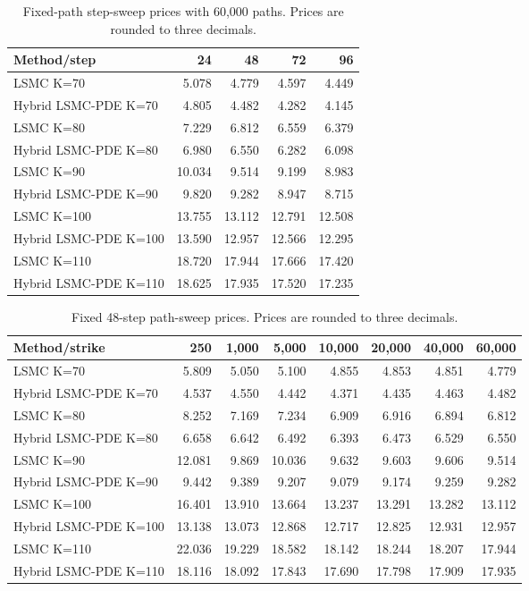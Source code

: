 \begin{table}[htbp]\centering
\caption{Fixed-path step-sweep prices with 60,000 paths. Prices are rounded to three decimals.}
\begin{tabular}{lrrrr}
\toprule
Method/step & 24 & 48 & 72 & 96 \\
\midrule
LSMC K=70 & 5.078 & 4.779 & 4.597 & 4.449 \\
Hybrid LSMC-PDE K=70 & 4.805 & 4.482 & 4.282 & 4.145 \\
LSMC K=80 & 7.229 & 6.812 & 6.559 & 6.379 \\
Hybrid LSMC-PDE K=80 & 6.980 & 6.550 & 6.282 & 6.098 \\
LSMC K=90 & 10.034 & 9.514 & 9.199 & 8.983 \\
Hybrid LSMC-PDE K=90 & 9.820 & 9.282 & 8.947 & 8.715 \\
LSMC K=100 & 13.755 & 13.112 & 12.791 & 12.508 \\
Hybrid LSMC-PDE K=100 & 13.590 & 12.957 & 12.566 & 12.295 \\
LSMC K=110 & 18.720 & 17.944 & 17.666 & 17.420 \\
Hybrid LSMC-PDE K=110 & 18.625 & 17.935 & 17.520 & 17.235 \\
\bottomrule
\end{tabular}
\end{table}

\begin{table}[htbp]\centering
\caption{Fixed 48-step path-sweep prices. Prices are rounded to three decimals.}
\begin{tabular}{lrrrrrrr}
\toprule
Method/strike & 250 & 1,000 & 5,000 & 10,000 & 20,000 & 40,000 & 60,000 \\
\midrule
LSMC K=70 & 5.809 & 5.050 & 5.100 & 4.855 & 4.853 & 4.851 & 4.779 \\
Hybrid LSMC-PDE K=70 & 4.537 & 4.550 & 4.442 & 4.371 & 4.435 & 4.463 & 4.482 \\
LSMC K=80 & 8.252 & 7.169 & 7.234 & 6.909 & 6.916 & 6.894 & 6.812 \\
Hybrid LSMC-PDE K=80 & 6.658 & 6.642 & 6.492 & 6.393 & 6.473 & 6.529 & 6.550 \\
LSMC K=90 & 12.081 & 9.869 & 10.036 & 9.632 & 9.603 & 9.606 & 9.514 \\
Hybrid LSMC-PDE K=90 & 9.442 & 9.389 & 9.207 & 9.079 & 9.174 & 9.259 & 9.282 \\
LSMC K=100 & 16.401 & 13.910 & 13.664 & 13.237 & 13.291 & 13.282 & 13.112 \\
Hybrid LSMC-PDE K=100 & 13.138 & 13.073 & 12.868 & 12.717 & 12.825 & 12.931 & 12.957 \\
LSMC K=110 & 22.036 & 19.229 & 18.582 & 18.142 & 18.244 & 18.207 & 17.944 \\
Hybrid LSMC-PDE K=110 & 18.116 & 18.092 & 17.843 & 17.690 & 17.798 & 17.909 & 17.935 \\
\bottomrule
\end{tabular}
\end{table}

